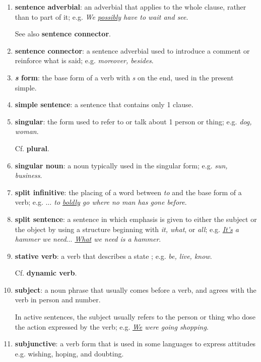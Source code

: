 \documentclass[oneside]{book}
\numberwithin{equation}{section}
\begin{document}
\begin{enumerate}
    A sentence in writing has a capital letter at the beginning and a full-stop, question mark, or exclamation mark at the end.
    \item \textbf{sentence adverbial}: an adverbial that applies to the whole clause, rather than to part of it; e.g. \textit{We \underline{possibly} have to wait and see}.
    
    See also \textbf{sentence connector}.
    \item \textbf{sentence connector}: a sentence adverbial used to introduce a comment or reinforce what is said; e.g. \textit{moreover, besides}.
    \item \textbf{\textit{s} form}: the base form of a verb with \textit{s} on the end, used in the present simple.
    \item \textbf{simple sentence}: a sentence that contains only 1 clause.
    \item \textbf{singular}: the form used to refer to or talk about 1 person or thing; e.g. \textit{dog, woman}.
    
    Cf. \textbf{plural}.
    \item \textbf{singular noun}: a noun typically used in the singular form; e.g. \textit{sun, business}.
    \item \textbf{split infinitive}: the placing of a word between \textit{to} and the base form of a verb; e.g. \textit{$\ldots$ to \underline{boldly} go where no man has gone before}.
    \item \textbf{split sentence}: a sentence in which emphasis is given to either the subject or the object by using a structure beginning with \textit{it, what}, or \textit{all}; e.g. \textit{\underline{It's} a hammer we need$\ldots$ \underline{What} we need is a hammer}.
    \item \textbf{stative verb}: a verb that describes a state ; e.g. \textit{be, live, know}.
    
    Cf. \textbf{dynamic verb}.
    \item \textbf{subject}: a noun phrase that usually comes before a verb, and agrees with the verb in person and number.
    
    In active sentences, the subject usually refers to the person or thing who dose the action expressed by the verb; e.g. \textit{\underline{We} were going shopping}.
    \item \textbf{subjunctive}: a verb form that is used in some languages to express attitudes e.g. wishing, hoping, and doubting.
    

\end{enumerate}
\end{document}
